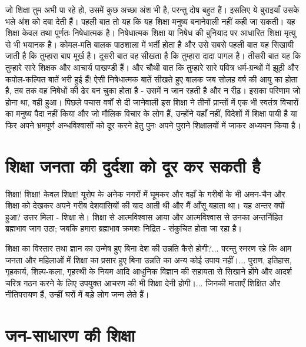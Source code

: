 जो शिक्षा तुम अभी पा रहे हो, उसमें कुछ अच्छा अंश भी है, परन्तु दोष बहुत हैं। इसलिए ये बुराइयाँ उसके भले अंश को दबा देती हैं। पहली बात तो यह कि यह शिक्षा मनुष्य बनानेवाली नहीं कही जा सकती। यह शिक्षा केवल तथा पूर्णतः निषेधात्मक है। निषेधात्मक शिक्षा या निषेध की बुनियाद पर आधारित शिक्षा मृत्यु से भी भयानक है। कोमल-मति बालक पाठशाला में भर्ती होता है और उसे सबसे पहली बात यह सिखायी जाती है कि तुम्हारा बाप मूर्ख है। दूसरी बात वह सीखता है कि तुम्हारा दादा पागल है। तीसरी बात यह कि तुम्हारे सारे शिक्षक और आचार्य पाखण्डी हैं। और चौथी बात कि तुम्हारे सारे पवित्र धर्म-ग्रन्थों में झूठी और कपोल-कल्पित बातें भरी हुई हैं! ऐसी निषेधात्मक बातें सीखते हुए बालक जब सोलह वर्ष की आयु का होता है, तब तक वह निषेधों की ढेर बन चुका होता है - उसमें न जान रहती है और न रीढ़। इसका परिणाम जो होना था, वही हुआ। पिछले पचास वर्षों से दी जानेवाली इस शिक्षा ने तीनों प्रान्तों में एक भी स्वतंत्र विचारों का मनुष्य पैदा नहीं किया और जो मौलिक विचार के लोग हैं, उन्होंने यहाँ नहीं, विदेशों में शिक्षा पायी है या फिर अपने भ्रमपूर्ण अन्धविश्वासों को दूर करने हेतु पुनः अपने पुराने शिक्षालयों में जाकर अध्ययन किया है। 

\vskip 2pt


\section*{शिक्षा जनता की दुर्दशा को दूर कर सकती है}


शिक्षा! शिक्षा! केवल शिक्षा! यूरोप के अनेक नगरों में घूमकर और वहाँ के गरीबों के भी अमन-चैन और शिक्षा को देखकर अपने गरीब देशवासियों की याद आती थी और मैं आँसू बहाता था। यह अन्तर क्यों हुआ? उत्तर मिला - शिक्षा से। शिक्षा से आत्मविश्वास आया और आत्मविश्वास से उनका अन्तर्निहित ब्रह्मभाव जाग उठा; जबकि हमारा ब्रह्मभाव क्रमशः निद्रित - संकुचित होता जा रहा है। 

\vskip 3pt

शिक्षा का विस्तार तथा ज्ञान का उन्मेष हुए बिना देश की उन्नति कैसे होगी?... परन्तु स्मरण रहे कि आम जनता और महिलाओं में शिक्षा का प्रसार हुए बिना उन्नति का अन्य कोई उपाय नहीं।... पुराण, इतिहास, गृहकार्य, शिल्प-कला, गृहस्थी के नियम आदि आधुनिक विज्ञान की सहायता से सिखाने होंगे और आदर्श चरित्र गठन करने के लिए उपयुक्त आचरण की भी शिक्षा देनी होगी।... जिनकी माताएँ शिक्षित और नीतिपरायण हैं, उन्हीं घरों में बड़े लोग जन्म लेते हैं।


\section*{जन-साधारण की शिक्षा}

